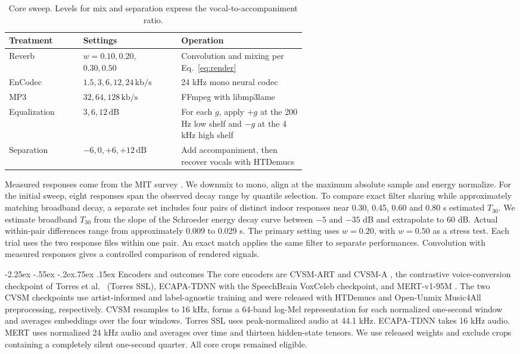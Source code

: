 \documentclass[10pt,a4paper]{article}
\makeatletter
\renewcommand\subsection{\@startsection{subsection}{2}{\z@}%
  {-2.25ex \@plus -.55ex \@minus -.2ex}{.75ex \@plus .15ex}%
  {\normalfont\normalsize\sffamily\bfseries}}
\newcommand{\db}{\,\mathrm{dB}}
\newcommand{\kbs}{\,\mathrm{kb/s}}
\makeatother
\begin{document}
\begin{table}[htbp]
\centering\footnotesize
\setlength{\tabcolsep}{3pt}
\caption{Core sweep. Levels for mix and separation express the vocal-to-accompaniment ratio.}
\label{tab:conditions}
\begin{tabularx}{\linewidth}{@{}p{0.25\linewidth}>{\raggedright\arraybackslash}p{0.33\linewidth}Y@{}}
\toprule
Treatment & Settings & Operation \\
\midrule
Reverb & $w=0.10,0.20,$ $0.30,0.50$ & Convolution and mixing per Eq.~\eqref{eq:render} \\
EnCodec & $1.5,3,6,12,24\kbs$ & 24 kHz mono neural codec \cite{encodec} \\
MP3 & $32,64,128\kbs$ & FFmpeg with libmp3lame \\
Equalization & $3,6,12\db$ & For each $g$, apply $+g$ at the 200 Hz low shelf and $-g$ at the 4 kHz high shelf \\
Separation & $-6,0,+6,+12\db$ & Add accompaniment, then recover vocals with HTDemucs \cite{demucs} \\
\bottomrule
\end{tabularx}
\end{table}

Measured responses come from the MIT survey \cite{traer}. We downmix to mono, align at the maximum absolute sample and energy normalize. For the initial sweep, eight responses span the observed decay range by quantile selection. To compare exact filter sharing while approximately matching broadband decay, a separate set includes four pairs of distinct indoor responses near 0.30, 0.45, 0.60 and 0.80 s estimated $T_{30}$. We estimate broadband $T_{30}$ from the slope of the Schroeder energy decay curve between $-5$ and $-35$ dB and extrapolate to 60 dB. Actual within-pair differences range from approximately 0.009 to 0.029 s. The primary setting uses $w=0.20$, with $w=0.50$ as a stress test. Each trial uses the two response files within one pair. An exact match applies the same filter to separate performances. Convolution with measured responses gives a controlled comparison of rendered signals.

\subsection{Encoders and outcomes}
The core encoders are CVSM-ART and CVSM-A \cite{cvsm}, the contrastive voice-conversion checkpoint of Torres et al.\ \cite{torres} (Torres SSL), ECAPA-TDNN \cite{ecapa} with the SpeechBrain VoxCeleb checkpoint, and MERT-v1-95M \cite{mert}. The two CVSM checkpoints use artist-informed and label-agnostic training and were released with HTDemucs and Open-Unmix Music4All preprocessing, respectively. CVSM resamples to 16 kHz, forms a 64-band log-Mel representation for each normalized one-second window and averages embeddings over the four windows. Torres SSL uses peak-normalized audio at 44.1 kHz. ECAPA-TDNN takes 16 kHz audio. MERT uses normalized 24 kHz audio and averages over time and thirteen hidden-state tensors. We use released weights and exclude crops containing a completely silent one-second quarter. All core crops remained eligible.
\end{document}
